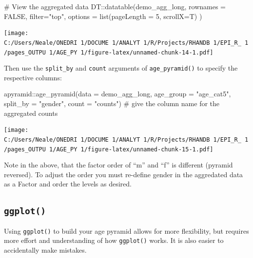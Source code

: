 \documentclass[
]{article}
\newenvironment{Shaded}{\begin{snugshade}}{\end{snugshade}}
\newcommand{\CommentTok}[1]{\textcolor[rgb]{0.50,0.62,0.50}{#1}}
\newcommand{\DataTypeTok}[1]{\textcolor[rgb]{0.87,0.87,0.75}{#1}}
\newcommand{\DecValTok}[1]{\textcolor[rgb]{0.86,0.86,0.80}{#1}}
\newcommand{\KeywordTok}[1]{\textcolor[rgb]{0.94,0.87,0.69}{#1}}
\newcommand{\NormalTok}[1]{\textcolor[rgb]{0.80,0.80,0.80}{#1}}
\newcommand{\OperatorTok}[1]{\textcolor[rgb]{0.94,0.94,0.82}{#1}}
\newcommand{\OtherTok}[1]{\textcolor[rgb]{0.94,0.94,0.56}{#1}}
\newcommand{\StringTok}[1]{\textcolor[rgb]{0.80,0.58,0.58}{#1}}
\begin{document}
\begin{Shaded}
\begin{Highlighting}[]
\CommentTok{\# View the aggregated data}
\NormalTok{DT}\OperatorTok{::}\KeywordTok{datatable}\NormalTok{(demo\_agg\_long, }\DataTypeTok{rownames =} \OtherTok{FALSE}\NormalTok{, }\DataTypeTok{filter=}\StringTok{"top"}\NormalTok{, }\DataTypeTok{options =} \KeywordTok{list}\NormalTok{(}\DataTypeTok{pageLength =} \DecValTok{5}\NormalTok{, }\DataTypeTok{scrollX=}\NormalTok{T) )}
\end{Highlighting}
\end{Shaded}

\texttt{[image: C:/Users/Neale/ONEDRI~1/DOCUME~1/ANALYT~1/R/Projects/RHANDB~1/EPI\_R\_~1/pages\_OUTPU~1/AGE\_PY~1/figure-latex/unnamed-chunk-14-1.pdf]}

Then use the \texttt{split\_by} and \texttt{count} arguments of
\texttt{age\_pyramid()} to specify the respective columns:

\begin{Shaded}
\begin{Highlighting}[]
\NormalTok{apyramid}\OperatorTok{::}\KeywordTok{age\_pyramid}\NormalTok{(}\DataTypeTok{data =}\NormalTok{ demo\_agg\_long,}
                      \DataTypeTok{age\_group =} \StringTok{"age\_cat5"}\NormalTok{,}
                      \DataTypeTok{split\_by =} \StringTok{"gender"}\NormalTok{,}
                      \DataTypeTok{count =} \StringTok{"counts"}\NormalTok{)      }\CommentTok{\# give the column name for the aggregated counts}
\end{Highlighting}
\end{Shaded}

\texttt{[image: C:/Users/Neale/ONEDRI~1/DOCUME~1/ANALYT~1/R/Projects/RHANDB~1/EPI\_R\_~1/pages\_OUTPU~1/AGE\_PY~1/figure-latex/unnamed-chunk-15-1.pdf]}

Note in the above, that the factor order of ``m'' and ``f'' is different
(pyramid reversed). To adjust the order you must re-define gender in the
aggredated data as a Factor and order the levels as desired.

\hypertarget{ggplot}{%
\subsection{\texorpdfstring{\texttt{ggplot()}}{ggplot()}}\label{ggplot}}

Using \texttt{ggplot()} to build your age pyramid allows for more
flexibility, but requires more effort and understanding of how
\texttt{ggplot()} works. It is also easier to accidentally make
mistakes.
\end{document}
